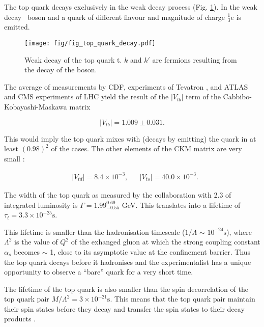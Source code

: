 The top quark decays exclusively in the weak decay process (Fig. \ref{fig:quark_decay}). In the weak decay \PW\ boson and a quark of different flavour and magnitude of charge $\frac{1}{3}e$ is emitted. 

\begin{figure}[H]
  \centering
  \texttt{[image: fig/fig\_top\_quark\_decay.pdf]}
  \caption{Weak decay of the top quark t. $k$ and $k'$ are fermions resulting from the decay of the \PW boson.}
  \label{fig:quark_decay}
\end{figure}

The average of measurements by CDF, \DZERO experiments of Tevatron \cite{Aaltonen:2015cra}, and ATLAS and CMS experiments of LHC \cite{twiki:tt_curve_toplhcwg_sep18} yield the result of the $|V_{tb}|$ term of the Cabbibo-Kobayashi-Maskawa matrix

\begin{equation}
  |V_{tb}|=1.009\pm0.031.
\end{equation}

This would imply the top quark mixes with (decays by emitting) the \cPqb quark in at least $(0.98)^{2}$ of the cases. The other elements of the CKM matrix are very small \cite{Patrignani:2016xqp}:

\begin{align}
  & |V_{td}|=8.4\times10^{-3}, && |V_{ts}|=40.0\times10^{-3}.
\end{align}

The width of the top quark as measured by the \DZERO collaboration \cite{Abazov:2010tm} with 2.3 \fbinv of integrated luminosity is $\Gamma=1.99^{0.69}_{-0.55}$ GeV. This translates into a lifetime of $\tau_{t}=3.3\times10^{-25}\text{s}$.

This lifetime is smaller than the hadronisation timescale ($1/\Lambda$ $\sim$ $10^{-24}\text{s}$), where $\Lambda^{2}$ is the value of $Q^{2}$ of the exhanged gluon at which the strong coupling constant $\alpha_{s}$ becomes $\sim$ 1, close to its asymptotic value at the confinement barrier. Thus the top quark decays before it hadronises and the experimentalist has a unique opportunity to observe a ``bare'' quark for a very short time.

The lifetime of the top quark is also smaller than the spin decorrelation of the top quark pair $M/{\Lambda^{2}}=3\times 10^{-21}\text{s}$. This means that the top quark pair maintain their spin states before they decay and transfer the spin states to their decay products \cite{Cristinziani:2016vif}.

